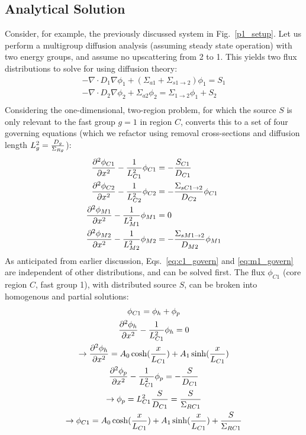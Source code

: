\documentclass[11pt]{article} %
\newcommand{\figref}[1]{Fig.~\ref{#1}}
\begin{document}
\subsection{Analytical Solution}
Consider, for example, the previously discussed system in \figref{p1_setup}.
Let us perform a multigroup diffusion analysis (assuming steady state operation) with two energy groups, and assume no upscattering from 2 to 1.
This yields two flux distributions to solve for using diffusion theory:
\begin{equation}
    \begin{aligned}
        - \nabla\cdot D_1\nabla\phi_1 + (\Sigma_{a1}+\Sigma_{s1\rightarrow 2})\phi_1= S_1\\
        - \nabla\cdot D_2\nabla\phi_2 + \Sigma_{a2}\phi_2= \Sigma_{1\rightarrow2}\phi_1 + S_2\\
    \end{aligned}
    \label{eq:multigroup-diff-nospace}
\end{equation}
Considering the one-dimensional, two-region problem, for which the source $S$ is only relevant to the fast group $g=1$ in region $C$, converts this to a set of four governing equations (which we refactor using removal cross-sections and diffusion length $L_g^2=\frac{D_g}{\Sigma_{Rg}}$):
\begin{align}
    \frac{\partial^{2}\phi_{C1}}{\partial{x}^{2}} - \frac{1}{L_{C1}^2}\phi_{C1} &= -\frac{S_{C1}}{D_{C1}}\label{eq:c1_govern}\\
    \frac{\partial^{2}\phi_{C2}}{\partial{x}^{2}} - \frac{1}{L_{C2}^2}\phi_{C2} &= -\frac{\Sigma_{sC1\rightarrow2}}{D_{C2}}\phi_{C1}\label{eq:c2_govern}\\
    \frac{\partial^{2}\phi_{M1}}{\partial{x}^{2}} - \frac{1}{L_{M1}^2}\phi_{M1} &= 0 \label{eq:m1_govern}\\
    \frac{\partial^{2}\phi_{M2}}{\partial{x}^{2}} - \frac{1}{L_{M2}^2}\phi_{M2} &= -\frac{\Sigma_{sM1\rightarrow2}}{D_{M2}}\phi_{M1}\label{eq:m2_govern}
\end{align}
\newcommand{\SigR}[1]{\Sigma_{R#1}}
As anticipated from earlier discussion, Eqs.~\ref{eq:c1_govern} and \ref{eq:m1_govern} are independent of other distributions, and can be solved first.
The flux $\phi_{C1}$ (core region $C$, fast group 1), with distributed source $S$, can be broken into homogenous and partial solutions:
\begin{equation}
    \begin{gathered}
        \phi_{C1}=\phi_h + \phi_p\\
        \pd{\phi_h}{x}{2} - \frac{1}{L_{C1}^2}\phi_h = 0\\
        \rightarrow\pd{\phi_h}{x}{2} = A_0\cosh(\frac{x}{L_{C1}}) + A_1\sinh(\frac{x}{L_{C1}})\\
        \pd{\phi_p}{x}{2} - \frac{1}{L_{C1}^2}\phi_p = -\frac{S}{D_{C1}} \\
        \rightarrow\phi_p = L_{C1}^2\frac{S}{D_{C1}} = \frac{S}{\SigR{C1}} \\
        \rightarrow\phi_{C1} = A_0\cosh(\frac{x}{L_{C1}}) + A_1\sinh(\frac{x}{L_{C1}}) + \frac{S}{\SigR{C1}}
    \end{gathered}
    \label{eq:c1_flux}
\end{equation}
\end{document}
